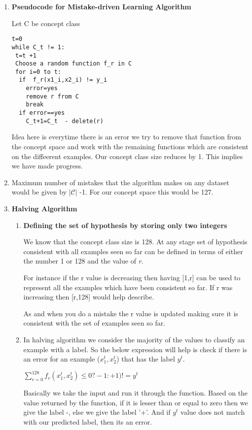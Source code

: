 \documentclass[12pt, fullpage,letterpaper]{article}
\begin{document}
\begin{enumerate}
	 \item \textbf{ Pseudocode for Mistake-driven Learning Algorithm}
	 
Let C be concept class	 
\begin{verbatim}
t=0
while C_t != 1:
 t=t +1
 Choose a random function f_r in C
 for i=0 to t:
  if  f_r(x1_i,x2_i) != y_i
  	error=yes
  	remove r from C
  	break
  if error==yes
  	C_t+1=C_t  - delete(r)
\end{verbatim}

Idea here is everytime there is an error we try to remove that function from the concept space and work with the remaining functions which are consistent on the diffeerent examples. Our concept class size reduces by 1. This implies we have made progress.	
	
	\item[] Maximum number of mistakes that the algorithm makes on any dataset would be given by $|\mathcal{C}|$  -1.  For our concept space this would be 127.
	
	\item \textbf{ Halving Algorithm}
	
		\begin{enumerate}
		
		\item \textbf{Defining the set of hypothesis by storing only two integers}	
		
		We know that the concept class size is 128. At any stage set of hypothesis consistent with all examples seen so far can be defined in terms of either the number 1 or 128 and the value of \emph r. 
		
		For instance if the r value is decreasing then having [1,r] can be used to represent all the examples which have been consistent so far. If r was increasing then [r,128] would help describe.
		
		As and when you do a mistake the r value is updated making sure it is consistent with the set of examples seen so far.
		
		\item  In halving algorithm we consider the majority of the values to classify an example with a label. So the below expression will help is check if there is an error for an example ($x_1^t,x_2^t$) that has the label $y^t$.
		
		\begin{center}
			$\sum_{r=0}^{128} f_r(x_1^t,x_2^t)  \leq 0  ? -1 :+1  ) != y^t$
		\end{center}
		Basically we take the input and run it through the function. Based on the value returned by the function, if it is lesser than or equal to zero then we give the label -, else we give the label '+'. And if $y^t$ value does not match with our predicted label, then its an error.
		

\end{enumerate}
\end{enumerate}
\end{document}
